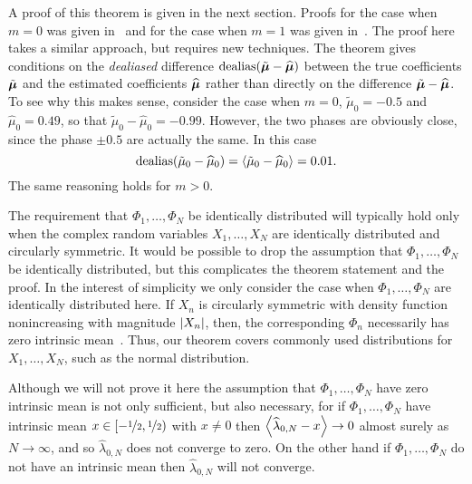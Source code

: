 \documentclass[journal]{IEEEtran}
\begin{document}
A proof of this theorem is given in the next section.  Proofs for the case when $m=0$ was given in~\cite{McKilliam_mean_dir_est_sq_arc_length2010} and for the case when $m=1$ was given in~\cite{McKilliamFrequencyEstimationByPhaseUnwrapping2009}.  The proof here takes a similar approach, but requires new techniques.  %
The theorem gives conditions on the \emph{dealiased} difference $\operatorname{dealias}(\tilde{\boldsymbol{\mu}} - \widehat{\boldsymbol{\mu}})$ between the true coefficients $\tilde{\boldsymbol{\mu}}$ and the estimated coefficients $\widehat{\boldsymbol{\mu}}$ rather than directly on the difference $\tilde{\boldsymbol{\mu}} - \widehat{\boldsymbol{\mu}}$.   To see why this makes sense, consider the case when $m=0$, $\tilde{\mu}_0 = -0.5$ and $\widehat{\mu}_0 = 0.49$, so that $\tilde{\mu}_0 - \widehat{\mu}_0 = -0.99$.  However, the two phases are obviously close, since the phase $\pm 0.5$ are actually the same.  In this case 
\[
\operatorname{dealias}(\tilde{\mu}_0 - \widehat{\mu}_0) = \left\langle \tilde{\mu}_0 - \widehat{\mu}_0 \right\rangle = 0.01.
\] 
The same reasoning holds for $m > 0$.

The requirement that $\Phi_1, \dots, \Phi_N$ be identically distributed will typically hold only when the complex random variables $X_1, \dots, X_N$ are identically distributed and circularly symmetric.  It would be possible to drop the assumption that $\Phi_1, \dots, \Phi_N$ be identically distributed, but this complicates the theorem statement and the proof.  In the interest of simplicity we only consider the case when $\Phi_1, \dots, \Phi_N$ are identically distributed here.  If $X_n$ is circularly symmetric with density function nonincreasing with magnitude $\left\vert X_n \right\vert$, then, the corresponding $\Phi_n$ necessarily has zero intrinsic mean~\cite[Theorem~5.2,~page~78]{McKilliam2010thesis}.  Thus, our theorem covers commonly used distributions for $X_1, \dots, X_N$, such as the normal distribution.

Although we will not prove it here the assumption that $\Phi_1,\dots,\Phi_N$ have zero intrinsic mean is not only sufficient, but also necessary, for if $\Phi_1,\dots,\Phi_N$ have intrinsic mean $x \in [-\nicefrac{1}{2},\nicefrac{1}{2})$ with $x \neq 0$ then $\left\langle \widehat{\lambda}_{0,N} - x \right\rangle\rightarrow 0$ almost surely as $N\rightarrow\infty$, and so $\widehat{\lambda}_{0,N}$ does not converge to zero.  On the other hand if $\Phi_1,\dots,\Phi_N$ do not have an intrinsic mean then $\widehat{\lambda}_{0,N}$ will not converge.

\end{document}
